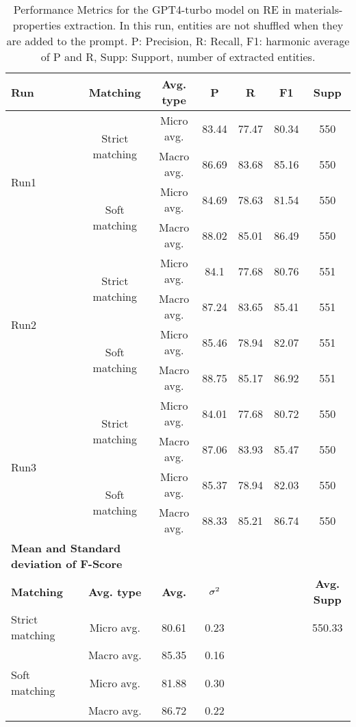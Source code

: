 
\begin{table}[htbp]
    \small
    \centering
    \caption{Performance Metrics for the GPT4-turbo model on RE in materials-properties extraction. In this run, entities are not shuffled when they are added to the prompt. P: Precision, R: Recall, F1: harmonic average of P and R, Supp: Support, number of extracted entities.}
    \begin{tabular}{lcccccc}
        \toprule
        \textbf{Run} & \textbf{Matching} & \textbf{Avg. type} & \textbf{P} & \textbf{R} & \textbf{F1} & \textbf{Supp}\\
        \midrule
        \multirow{4}{*}{Run1} & \multirow{2}{*}{Strict matching} & Micro avg. & 83.44 & 77.47 & 80.34 & 550 \\
        & & Macro avg. & 86.69 & 83.68 & 85.16 & 550 \\
        \cmidrule{2-7}
        & \multirow{2}{*}{Soft matching} & Micro avg. & 84.69 & 78.63 & 81.54 & 550 \\
        & & Macro avg. & 88.02 & 85.01 & 86.49 & 550 \\
        \midrule
        \multirow{4}{*}{Run2} & \multirow{2}{*}{Strict matching} & Micro avg. & 84.1 & 77.68 & 80.76 & 551 \\
        & & Macro avg. & 87.24 & 83.65 & 85.41 & 551 \\
        \cmidrule{2-7}
        & \multirow{2}{*}{Soft matching} & Micro avg. & 85.46 & 78.94 & 82.07 & 551 \\
        & & Macro avg. & 88.75 & 85.17 & 86.92 & 551 \\
        \midrule
        \multirow{4}{*}{Run3} & \multirow{2}{*}{Strict matching} & Micro avg. & 84.01 & 77.68 & 80.72 & 550 \\
        & & Macro avg. & 87.06 & 83.93 & 85.47 & 550 \\
        \cmidrule{2-7}
        & \multirow{2}{*}{Soft matching} & Micro avg. & 85.37 & 78.94 & 82.03 & 550 \\
        & & Macro avg. & 88.33 & 85.21 & 86.74 & 550 \\
        \midrule
        \multicolumn{2}{l}{\textbf{Mean and Standard deviation of F-Score}} & & & & & \\
        \midrule
        \textbf{Matching} & \textbf{Avg. type} & \textbf{Avg.} & $\sigma\textsuperscript{2}$ & & & \textbf{Avg. Supp}\\
        Strict matching & Micro avg. & 80.61 & 0.23 & & & 550.33 \\
        & Macro avg. & 85.35 & 0.16 & & & \\
        Soft matching & Micro avg. & 81.88 & 0.30 & & \\
        & Macro avg. & 86.72 & 0.22 & & \\
        \bottomrule
    \end{tabular}
\end{table}

